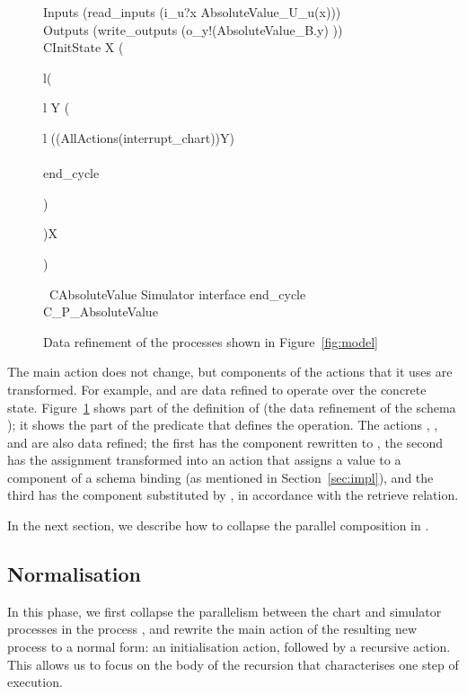 \documentclass[submission]{eptcs}
\renewcommand{\circblockbegin}{\left(\begin{array}{l}}
\renewcommand{\circblockend}{\end{array}\right)}
\begin{document}
\begin{figure}
\begin{minipage}{\textwidth}
\begin{circusaction}
Inputs \circdef (read\_inputs \then (i\_u?x \then AbsoluteValue\_U\_u(x)))\\
Outputs \circdef (write\_outputs \then (o\_y!(AbsoluteValue\_B.y) \then \Skip))\\
\circspot \lschexpract CInitState \rschexpract \circseq
\circmu X \circspot \circblockbegin\circblockbegin
\circmu Y \circspot
\circblockbegin
((AllActions\circinterrupt(interrupt\_chart\then\Skip))\circseq Y)\\
\extchoice\\
end\_cycle\then\Skip
\circblockend
\circblockend\circseq X\circblockend\\
\circend
\end{circusaction}
\vspace{-1cm}
\begin{circus}
\circprocess~CAbsoluteValue \circdef Simulator \lpar interface \cup \lchanset end\_cycle \rchanset \rpar C\_P\_AbsoluteValue
\end{circus}
\end{minipage}
\caption{Data refinement of the processes shown in Figure~\ref{fig:model}}
\label{fig:data-refined-model}
\end{figure}

The main action does not change, but components of the actions that it uses are transformed. For example,  and  are data refined to operate over the concrete state. Figure~\ref{fig:data-refined-model} shows part of the definition of  (the data refinement of the schema ); it shows the part of the predicate that defines the operation. The actions , , and  are also data refined; the first has the component  rewritten to , the second has the assignment transformed into an action that assigns a value to a component of a schema binding (as mentioned in Section~\ref{sec:impl}), and the third has the component  substituted by , in accordance with the retrieve relation.

In the next section, we describe how to collapse the parallel composition in .

\subsection{Normalisation}

In this phase, we first collapse the parallelism between the chart and simulator processes in the process , and rewrite the main action of the resulting new process to a normal form: an initialisation action, followed by a recursive action. This allows us to focus on the body of the recursion that characterises one step of execution.
\end{document}
